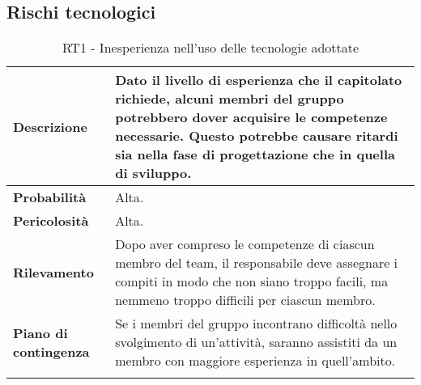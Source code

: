 \subsection{Rischi tecnologici}
\begin{longtable}{ | l | p{10cm} | }
	\hline
	\textbf{Descrizione}          & Dato il livello di esperienza che il capitolato richiede,  alcuni membri del gruppo potrebbero dover acquisire le competenze necessarie. Questo potrebbe causare ritardi sia nella fase di progettazione che in quella di sviluppo. \\
	\hline
	\textbf{Probabilità}          & Alta.                                                                                                                                                                                                                               \\
	\hline
	\textbf{Pericolosità}         & Alta.                                                                                                                                                                                                                               \\
	\hline
	\textbf{Rilevamento}          & Dopo aver compreso le competenze di ciascun membro del team, il responsabile deve assegnare i compiti in modo che non siano troppo facili, ma nemmeno troppo difficili per ciascun membro.                                          \\
	\hline
	\textbf{Piano di contingenza} & Se i membri del gruppo incontrano difficoltà nello svolgimento di un'attività, saranno assistiti da un membro con maggiore esperienza in quell'ambito.                                                                              \\
	\hline
	\caption{RT1 - Inesperienza nell'uso delle tecnologie adottate}
	\label{table:5}
\end{longtable}

